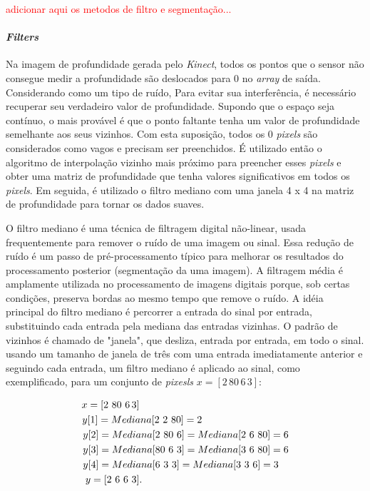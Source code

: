 \textcolor{red}{adicionar aqui os metodos de filtro e segmentação...}

\paragraph{\textit{Filters}}\label{sec:filters}
 Na imagem de profundidade gerada pelo \textit{Kinect}, todos os pontos que o sensor não consegue medir a profundidade são deslocados para 0 no \textit{array} de saída. Considerando  como um tipo de ruído, Para evitar sua interferência, é necessário recuperar seu verdadeiro valor de profundidade. Supondo que o espaço seja contínuo, o mais provável é que o ponto faltante tenha um valor de profundidade semelhante aos seus vizinhos. Com esta suposição, todos os 0 \textit{pixels} são considerados como vagos e precisam ser preenchidos. É utilizado então o algoritmo de interpolação vizinho mais próximo para preencher esses \textit{pixels} e obter uma matriz de profundidade que tenha valores significativos em todos os \textit{pixels}. Em seguida, é utilizado o filtro mediano com uma janela 4 x 4 na matriz de profundidade para tornar os dados suaves.

O filtro mediano é uma técnica de filtragem digital não-linear, usada frequentemente para remover o ruído de uma imagem ou sinal. Essa redução de ruído é um passo de pré-processamento típico para melhorar os resultados do processamento posterior (segmentação da uma imagem). A filtragem média é amplamente utilizada no processamento de imagens digitais porque, sob certas condições, preserva bordas ao mesmo tempo que remove o ruído. A idéia principal do filtro mediano é percorrer a entrada do sinal por entrada, substituindo cada entrada pela mediana das entradas vizinhas. O padrão de vizinhos é chamado de "janela", que desliza, entrada por entrada, em todo o sinal. usando um tamanho de janela de três com uma entrada imediatamente anterior e seguindo cada entrada, um filtro mediano é aplicado ao  sinal, como exemplificado, para um conjunto de \textit{pixesls} $x = [2\,80\, 6 \,3]$:

\begin{align*}
x = [2\,\, 80\,\, 6 \,3]\MoveEqLeft[23]\\
y[1] = Mediana[2\,\, 2\,\, 80] = 2\MoveEqLeft[16.7]\\
y[2] = Mediana[2\,\, 80\,\, 6] = Mediana[2\,\, 6\,\, 80] = 6\MoveEqLeft[8]\\
y[3] = Mediana[80\,\, 6\,\, 3] = Mediana[3\,\, 6\,\, 80] = 6\MoveEqLeft[8]\\
y[4] = Mediana[6\,\, 3\,\, 3] = Mediana[3\,\, 3\,\, 6] = 3\MoveEqLeft[9]\\
y = [2\,\, 6\,\, 6\,\, 3]\MoveEqLeft[23].
\end{align*}

